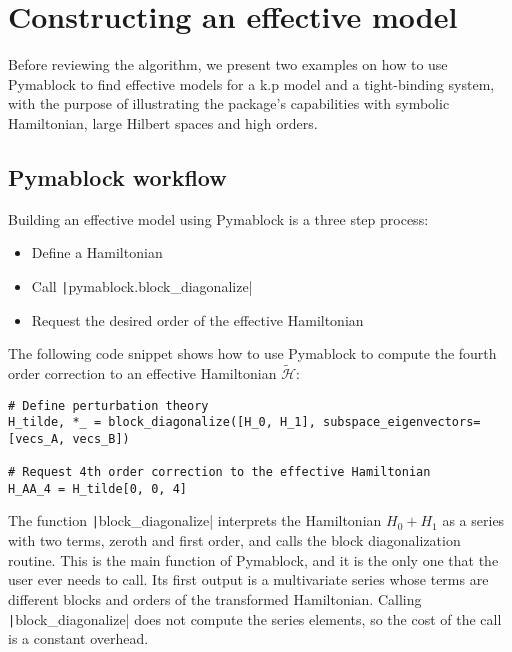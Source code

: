\section{Constructing an effective model}

Before reviewing the algorithm, we present two examples on how to use Pymablock
to find effective models for a k.p model and a tight-binding system, with the
purpose of illustrating the package's capabilities with symbolic Hamiltonian,
large Hilbert spaces and high orders.

\subsection{Pymablock workflow}

Building an effective model using Pymablock is a three step process:
%
\begin{itemize}
\item Define a Hamiltonian
\item Call \texttt|pymablock.block_diagonalize|
\item Request the desired order of the effective Hamiltonian
\end{itemize}
%
The following code snippet shows how to use Pymablock to compute the fourth
order correction to an effective Hamiltonian $\tilde{\mathcal{H}}$:
%
\begin{verbatim}
# Define perturbation theory
H_tilde, *_ = block_diagonalize([H_0, H_1], subspace_eigenvectors=[vecs_A, vecs_B])

# Request 4th order correction to the effective Hamiltonian
H_AA_4 = H_tilde[0, 0, 4]
\end{verbatim}


The function \texttt|block_diagonalize| interprets the Hamiltonian
$H_0 + H_1$ as a series with two terms, zeroth and first order, and calls the
block diagonalization routine.
This is the main function of Pymablock, and it is the only one that the user
ever needs to call.
Its first output is a multivariate series whose terms are different blocks and
orders of the transformed Hamiltonian.
Calling \texttt|block_diagonalize| does not compute the series
elements, so the cost of the call is a constant overhead.

